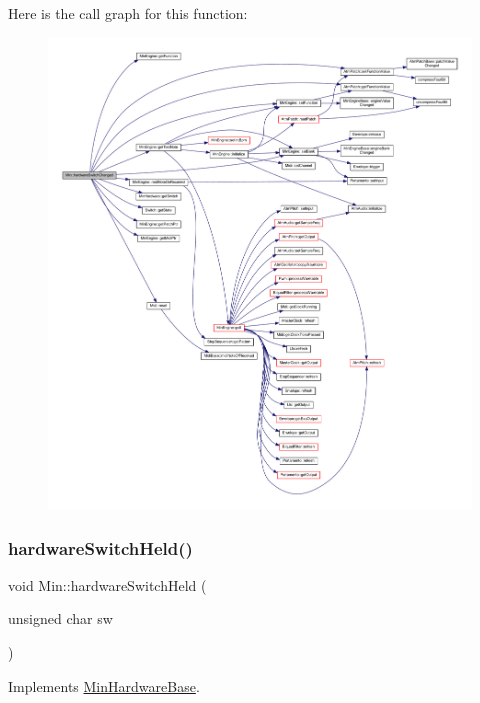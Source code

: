 Here is the call graph for this function\+:
\nopagebreak
\begin{figure}[H]
\begin{center}
\leavevmode
\includegraphics[width=350pt]{dd/d34/class_min_ae00f275ac6aeb73f932e62ae85abe5b1_cgraph}
\end{center}
\end{figure}
\mbox{\label{class_min_aa17c2510883d894f135d6a0582cc8bea}} 
\subsubsection{\texorpdfstring{hardware\+Switch\+Held()}{hardwareSwitchHeld()}}
{\footnotesize\ttfamily void Min\+::hardware\+Switch\+Held (\begin{DoxyParamCaption}\item[{unsigned char}]{sw }\end{DoxyParamCaption})\hspace{0.3cm}{\ttfamily [virtual]}}



Implements \hyperlink{class_min_hardware_base_a9e05f7b18377441b61457ded9a57f088}{Min\+Hardware\+Base}.



